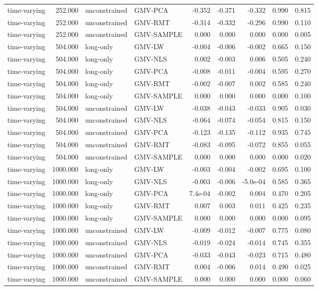 \begin{table}[t]
{\begin{tabular}{lrllrrrrr}
time-varying & 252.000 & unconstrained & GMV-PCA & -0.352 & -0.371 & -0.332 & 0.990 & 0.815 \\
time-varying & 252.000 & unconstrained & GMV-RMT & -0.314 & -0.332 & -0.296 & 0.990 & 0.110 \\
time-varying & 252.000 & unconstrained & GMV-SAMPLE & 0.000 & 0.000 & 0.000 & 0.000 & 0.005 \\
time-varying & 504.000 & long-only & GMV-LW & -0.004 & -0.006 & -0.002 & 0.665 & 0.150 \\
time-varying & 504.000 & long-only & GMV-NLS & 0.002 & -0.003 & 0.006 & 0.505 & 0.240 \\
time-varying & 504.000 & long-only & GMV-PCA & -0.008 & -0.011 & -0.004 & 0.595 & 0.270 \\
time-varying & 504.000 & long-only & GMV-RMT & -0.002 & -0.007 & 0.002 & 0.585 & 0.240 \\
time-varying & 504.000 & long-only & GMV-SAMPLE & 0.000 & 0.000 & 0.000 & 0.000 & 0.100 \\
time-varying & 504.000 & unconstrained & GMV-LW & -0.038 & -0.043 & -0.033 & 0.905 & 0.030 \\
time-varying & 504.000 & unconstrained & GMV-NLS & -0.064 & -0.074 & -0.054 & 0.815 & 0.150 \\
time-varying & 504.000 & unconstrained & GMV-PCA & -0.123 & -0.135 & -0.112 & 0.935 & 0.745 \\
time-varying & 504.000 & unconstrained & GMV-RMT & -0.083 & -0.095 & -0.072 & 0.855 & 0.055 \\
time-varying & 504.000 & unconstrained & GMV-SAMPLE & 0.000 & 0.000 & 0.000 & 0.000 & 0.020 \\
time-varying & 1000.000 & long-only & GMV-LW & -0.003 & -0.004 & -0.002 & 0.695 & 0.100 \\
time-varying & 1000.000 & long-only & GMV-NLS & -0.003 & -0.006 & -5.0e-04 & 0.585 & 0.365 \\
time-varying & 1000.000 & long-only & GMV-PCA & 7.4e-04 & -0.002 & 0.004 & 0.470 & 0.205 \\
time-varying & 1000.000 & long-only & GMV-RMT & 0.007 & 0.003 & 0.011 & 0.425 & 0.235 \\
time-varying & 1000.000 & long-only & GMV-SAMPLE & 0.000 & 0.000 & 0.000 & 0.000 & 0.095 \\
time-varying & 1000.000 & unconstrained & GMV-LW & -0.009 & -0.012 & -0.007 & 0.775 & 0.080 \\
time-varying & 1000.000 & unconstrained & GMV-NLS & -0.019 & -0.024 & -0.014 & 0.745 & 0.355 \\
time-varying & 1000.000 & unconstrained & GMV-PCA & -0.033 & -0.043 & -0.023 & 0.715 & 0.480 \\
time-varying & 1000.000 & unconstrained & GMV-RMT & 0.004 & -0.006 & 0.014 & 0.490 & 0.025 \\
time-varying & 1000.000 & unconstrained & GMV-SAMPLE & 0.000 & 0.000 & 0.000 & 0.000 & 0.060 \\
\bottomrule
\end{tabular}}
\end{table}
